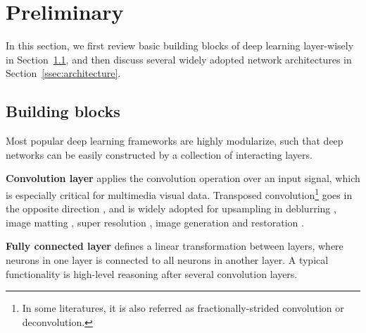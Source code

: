 \section{Preliminary}
\label{sec:funda}

In this section, we first review basic building blocks of deep learning layer-wisely in Section~\ref{ssec:layers}, and then discuss several widely adopted network architectures in Section~\ref{ssec:architecture}.

\subsection{Building blocks}
\label{ssec:layers}

Most popular deep learning frameworks are highly modularize, such that deep networks can be easily constructed by a collection of interacting layers. 

\textbf{Convolution layer} \cite{NIPS2012_4824} applies the convolution operation over an input signal, which is especially critical for multimedia visual data. 
Transposed convolution\footnote{In some literatures, it is also referred as fractionally-strided convolution or deconvolution.} goes in the opposite direction \cite{arXiv:1603.07285}, and is widely adopted for upsampling in deblurring \cite{su2016deep}, image matting \cite{deepmatting}, super resolution \cite{arXiv:1704.03915}, image generation \cite{dcgan} and restoration \cite{NIPS2016}.


\textbf{Fully connected layer} \cite{Rumelhart:1986:LIR:104279.104293} defines a linear transformation between layers, where neurons in one layer is connected to all neurons in another layer. A typical functionality is high-level reasoning \cite{NIPS2012_4824} after several convolution layers. 


